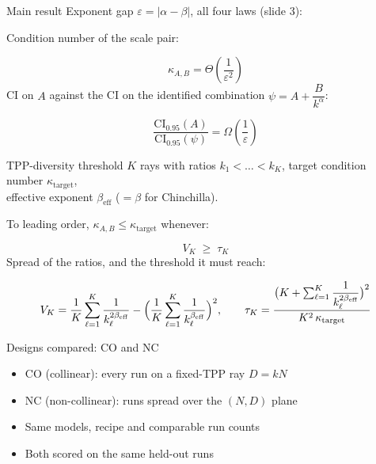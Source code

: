 \documentclass[aspectratio=169,11pt]{beamer}
\begin{document}
\begin{frame}{Main result}
  Exponent gap $\varepsilon = |\alpha - \beta|$, all four laws (slide 3):\par\medskip
  Condition number of the scale pair:\par
  {\Large\boldmath \[ \kappa_{A,B} = \Theta\!\left(\dfrac{1}{\varepsilon^{2}}\right) \]}
  CI on $A$ against the CI on the identified combination $\psi = A + \dfrac{B}{k^{\alpha}}$:\par
  {\Large\boldmath \[ \dfrac{\mathrm{CI}_{0.95}(A)}{\mathrm{CI}_{0.95}(\psi)} = \Omega\!\left(\dfrac{1}{\varepsilon}\right) \]}
\end{frame}

\begin{frame}{TPP-diversity threshold}
  $K$ rays with ratios $k_1 < \dots < k_K$, target condition number $\kappa_{\mathrm{target}}$,\\
  effective exponent $\beta_{\mathrm{eff}}$ ($= \beta$ for Chinchilla).\par\medskip
  To leading order, $\kappa_{A,B} \leq \kappa_{\mathrm{target}}$ whenever:\par
  {\Large\boldmath \[ V_K \;\geq\; \tau_K \]}
  Spread of the ratios, and the threshold it must reach:\par
  {\boldmath \[ V_K = \dfrac{1}{K}\sum_{\ell=1}^{K} \dfrac{1}{k_\ell^{2\beta_{\mathrm{eff}}}}
      - \Bigl(\dfrac{1}{K}\sum_{\ell=1}^{K} \dfrac{1}{k_\ell^{\beta_{\mathrm{eff}}}}\Bigr)^{2},
    \qquad
    \tau_K = \dfrac{\bigl(K + \sum_{\ell=1}^{K} \dfrac{1}{k_\ell^{2\beta_{\mathrm{eff}}}}\bigr)^{2}}{K^{2}\,\kappa_{\mathrm{target}}} \]}
\end{frame}

\begin{frame}{Designs compared: CO and NC}
  \begin{itemize}\setlength{\itemsep}{16pt}
    \item CO (collinear): every run on a fixed-TPP ray $D = kN$
    \item NC (non-collinear): runs spread over the $(N, D)$ plane
    \item Same models, recipe and comparable run counts
    \item Both scored on the same held-out runs
  \end{itemize}
\end{frame}
\end{document}
